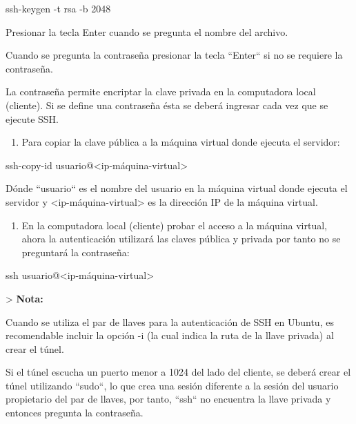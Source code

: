 \documentclass[11pt,a4paper,oneside]{book}
\begin{document}
\begin{SourceCode}
ssh-keygen -t rsa -b 2048
\end{SourceCode}

Presionar la tecla Enter cuando se pregunta el nombre del archivo.

Cuando se pregunta la contraseña presionar la tecla ``Enter`` si no se requiere la contraseña.

La contraseña permite encriptar la clave privada en la computadora local (cliente). Si se define una contraseña ésta se deberá ingresar cada vez que se ejecute SSH.

\begin{enumerate}

\item Para copiar la clave pública a la máquina virtual donde ejecuta el servidor:

\end{enumerate}

\begin{SourceCode}
ssh-copy-id usuario@<ip-máquina-virtual>
\end{SourceCode}

Dónde ``usuario`` es el nombre del usuario en la máquina virtual donde ejecuta el servidor y <ip-máquina-virtual> es la dirección IP de la máquina virtual.

\begin{enumerate}

\item En la computadora local (cliente) probar el acceso a la máquina virtual, ahora la autenticación utilizará las claves pública y privada por tanto no se preguntará la contraseña:

\end{enumerate}

\begin{SourceCode}
ssh usuario@<ip-máquina-virtual>
\end{SourceCode}

> \textbf{Nota:}

Cuando se utiliza el par de llaves para la autenticación de SSH en Ubuntu, es recomendable incluir la opción -i (la cual indica la ruta de la llave privada) al crear el túnel.

Si el túnel escucha un puerto menor a 1024 del lado del cliente, se deberá crear el túnel utilizando ``sudo``, lo que crea una sesión diferente a la sesión del usuario propietario del par de llaves, por tanto, ``ssh`` no encuentra la llave privada y entonces pregunta la contraseña.
\end{document}
